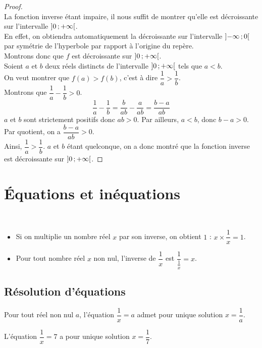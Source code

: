   \begin{proof}~\\
La fonction inverse étant impaire, il nous suffit de montrer qu'elle est décroissante sur l'intervalle $\mathopen{]}0\,;+\infty\mathclose{[}$. \\En effet, on obtiendra automatiquement la décroissante sur l'intervalle $\mathopen{]}-\infty\,;0\mathclose{[}$ par symétrie de l'hyperbole par rapport à l'origine du repère.\\
Montrons donc que $f$ est décroissante sur $\mathopen{]}0\,;+\infty\mathclose{[}$.\\
Soient $a$ et $b$ deux réels distincts de l'intervalle $\mathopen{]}0\,;+\infty\mathclose{[}$ tels que $a<b$.\\
On veut montrer que $f(a)>f(b)$, c'est à dire $\dfrac{1}{a}>\dfrac{1}{b}$.\\
Montrons que $\dfrac{1}{a}-\dfrac{1}{b}>0$.
$$\dfrac{1}{a}-\dfrac{1}{b}=\dfrac{b}{ab}-\dfrac{a}{ab}=\dfrac{b-a}{ab}$$
$a$ et $b$ sont strictement positifs donc $ab>0$. Par ailleurs, $a<b$, donc $b-a>0$. Par quotient, on a $\dfrac{b-a}{ab}>0$. \\Ainsi, $\dfrac{1}{a}>\dfrac{1}{b}$. $a$ et $b$ étant quelconque, on a donc montré que la fonction inverse est décroissante sur $\mathopen{]}0\,;+\infty\mathclose{[}$. 
  \end{proof}

\section{Équations et inéquations}
\begin{Propriété} $ $
\begin{itemize}[label=\textcolor{Couleur2}{$\bullet$}]
\item Si on multiplie un nombre réel $x$ par son inverse, on obtient $1$ : $x\times \dfrac{1}{x}=1$.
\item Pour tout nombre réel $x$ non nul, l'inverse de $\dfrac{1}{x}$ est $\dfrac{1}{\frac{1}{x}}=x$.
\end{itemize}
\end{Propriété}


\subsection{Résolution d'équations}
\begin{Définition}
Pour tout réel non nul $a$, l'équation $\dfrac{1}{x}=a$ admet pour unique solution $x=\dfrac{1}{a}$.
\end{Définition}

\begin{Exemple}
L'équation $\dfrac{1}{x}=7$ a pour unique solution $x=\dfrac{1}{7}$.
\end{Exemple}

